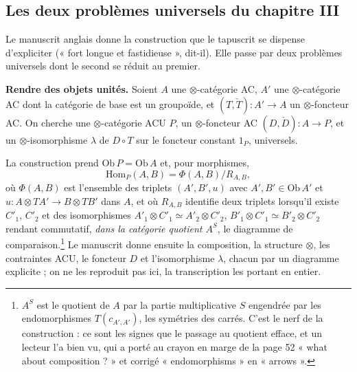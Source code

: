 \documentclass[11pt,a4paper]{article}
\begin{document}
\subsection*{Les deux problèmes universels du chapitre III}

Le manuscrit anglais donne la construction que le tapuscrit se dispense
d'expliciter (« fort longue et fastidieuse », dit-il). Elle passe par deux
problèmes universels dont le second se réduit au premier.

\textbf{Rendre des objets unités.} Soient $A$ une $\otimes$-catégorie AC, $A'$
une $\otimes$-catégorie AC dont la catégorie de base est un groupoïde, et
$(T,\check{T}) : A' \to A$ un $\otimes$-foncteur AC. On cherche une
$\otimes$-catégorie ACU $P$, un $\otimes$-foncteur AC $(D,\check{D}) : A \to
P$, et un $\otimes$-isomorphisme $\lambda$ de $D \circ T$ sur le foncteur
constant $1_{P}$, universels.

La construction prend $\mathrm{Ob}\,P = \mathrm{Ob}\,A$ et, pour morphismes,
\[
\mathrm{Hom}_{P}(A,B) = \Phi(A,B)/R_{A,B},
\]
où $\Phi(A,B)$ est l'ensemble des triplets $(A', B', u)$ avec $A', B' \in
\mathrm{Ob}\,A'$ et $u : A \otimes TA' \to B \otimes TB'$ dans $A$, et où
$R_{A,B}$ identifie deux triplets lorsqu'il existe $C'_{1}$, $C'_{2}$ et des
isomorphismes $A'_{1} \otimes C'_{1} \simeq A'_{2} \otimes C'_{2}$, $B'_{1}
\otimes C'_{1} \simeq B'_{2} \otimes C'_{2}$ rendant commutatif, \emph{dans la
catégorie quotient $A^{S}$}, le diagramme de comparaison.\footnote{$A^{S}$ est
le quotient de $A$ par la partie multiplicative $S$ engendrée par les
endomorphismes $T(c_{A',A'})$, les symétries des carrés. C'est le nerf de la
construction : ce sont les signes que le passage au quotient
efface, et un lecteur l'a bien vu, qui a porté au crayon en marge de la page
52 « what about composition ? » et corrigé « endomorphisms » en « arrows ».}
Le manuscrit donne ensuite la composition, la structure $\otimes$, les
contraintes ACU, le foncteur $D$ et l'isomorphisme $\lambda$, chacun par un
diagramme explicite ; on ne les reproduit pas ici, la transcription les
portant en entier.
\end{document}

